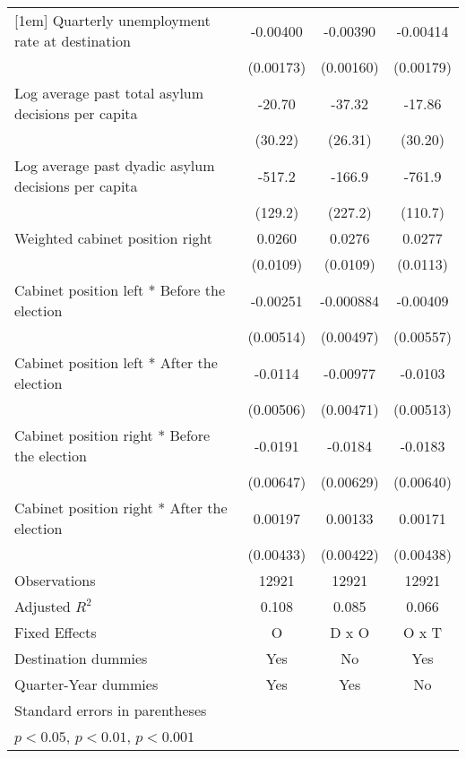 \begin{table}[htbp]
\begin{tabular}{l*{3}{c}}
[1em]
Quarterly unemployment rate at destination&    -0.00400\sym{*}  &    -0.00390\sym{*}  &    -0.00414\sym{*}  \\
                    &   (0.00173)         &   (0.00160)         &   (0.00179)         \\
[1em]
Log average past total asylum decisions per capita&      -20.70         &      -37.32         &      -17.86         \\
                    &     (30.22)         &     (26.31)         &     (30.20)         \\
[1em]
Log average past dyadic asylum decisions per capita&      -517.2\sym{***}&      -166.9         &      -761.9\sym{***}\\
                    &     (129.2)         &     (227.2)         &     (110.7)         \\
[1em]
Weighted cabinet position right&      0.0260\sym{*}  &      0.0276\sym{*}  &      0.0277\sym{*}  \\
                    &    (0.0109)         &    (0.0109)         &    (0.0113)         \\
[1em]
Cabinet position left * Before the election&    -0.00251         &   -0.000884         &    -0.00409         \\
                    &   (0.00514)         &   (0.00497)         &   (0.00557)         \\
[1em]
Cabinet position left * After the election&     -0.0114\sym{*}  &    -0.00977\sym{*}  &     -0.0103         \\
                    &   (0.00506)         &   (0.00471)         &   (0.00513)         \\
[1em]
Cabinet position right * Before the election&     -0.0191\sym{**} &     -0.0184\sym{**} &     -0.0183\sym{**} \\
                    &   (0.00647)         &   (0.00629)         &   (0.00640)         \\
[1em]
Cabinet position right * After the election&     0.00197         &     0.00133         &     0.00171         \\
                    &   (0.00433)         &   (0.00422)         &   (0.00438)         \\
\hline
Observations        &       12921         &       12921         &       12921         \\
Adjusted \(R^{2}\)  &       0.108         &       0.085         &       0.066         \\
Fixed Effects       &           O         &       D x O         &       O x T         \\
Destination dummies &         Yes         &          No         &         Yes         \\
Quarter-Year dummies&         Yes         &         Yes         &          No         \\
\hline\hline
\multicolumn{4}{l}{\footnotesize Standard errors in parentheses}\\
\multicolumn{4}{l}{\footnotesize \sym{*} \(p<0.05\), \sym{**} \(p<0.01\), \sym{***} \(p<0.001\)}\\
\end{tabular}
\end{table}
